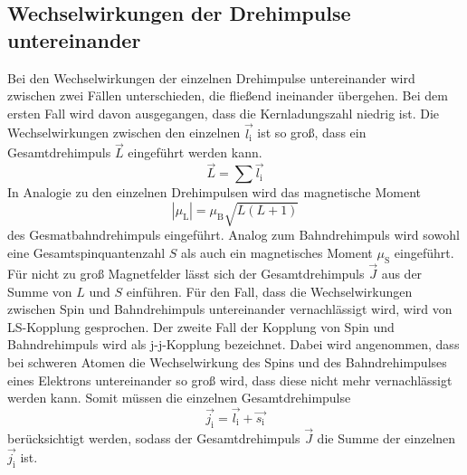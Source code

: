 \subsection{Wechselwirkungen der Drehimpulse untereinander}
Bei den Wechselwirkungen der einzelnen Drehimpulse untereinander wird zwischen zwei Fällen unterschieden, die fließend ineinander übergehen. Bei dem ersten Fall wird davon ausgegangen, dass die Kernladungszahl niedrig ist. Die Wechselwirkungen zwischen den einzelnen $\vec{l_\text{i}}$ ist so groß, dass ein Gesamtdrehimpuls $\vec{L}$ eingeführt werden kann.
\begin{equation}
  \vec{L} = \sum \vec{l_\text{i}}
  \label{eqn:L}
\end{equation}
In Analogie zu den einzelnen Drehimpulsen wird das magnetische Moment
\begin{equation}
  |\mu_\text{L}| = \mu_\text{B} \sqrt{L(L+1)}
  \label{magL}
\end{equation}
des Gesmatbahndrehimpuls eingeführt. Analog zum Bahndrehimpuls wird sowohl eine Gesamtspinquantenzahl $S$ als auch ein magnetisches Moment $\mu_\text{S}$ eingeführt. Für nicht zu groß Magnetfelder lässt sich der Gesamtdrehimpuls $\vec{J}$ aus der Summe von $L$ und $S$ einführen. Für den Fall, dass die Wechselwirkungen zwischen Spin und Bahndrehimpuls untereinander vernachlässigt wird, wird von LS-Kopplung gesprochen.
Der zweite Fall der Kopplung von Spin und Bahndrehimpuls wird als j-j-Kopplung bezeichnet. Dabei wird angenommen, dass bei schweren Atomen die Wechselwirkung des Spins und des Bahndrehimpulses eines Elektrons untereinander so groß wird, dass diese nicht mehr vernachlässigt werden kann. Somit müssen die einzelnen Gesamtdrehimpulse
\begin{equation}
  \vec{j_\text{i}} = \vec{l_\text{i}} + \vec{s_\text{i}}
  \label{eqn:j}
\end{equation}
berücksichtigt werden, sodass der Gesamtdrehimpuls $\vec{J}$ die Summe der einzelnen $\vec{j_\text{i}}$ ist.

